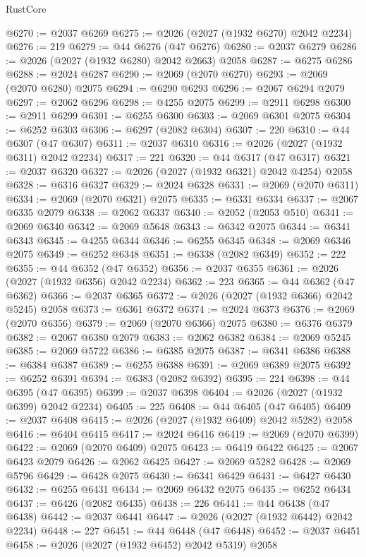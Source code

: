 \begin{lexlean}{RustCore}
\begin{coremodule}
@6270 := @2037 @6269
@6275 := @2026 (@2027 (@1932 @6270) @2042 @2234)
@6276 := 219
@6279 := @44 @6276 (@47 @6276)
@6280 := @2037 @6279
@6286 := @2026 (@2027 (@1932 @6280) @2042 @2663) @2058
@6287 := @6275 @6286
@6288 := @2024 @6287
@6290 := @2069 (@2070 @6270)
@6293 := @2069 (@2070 @6280) @2075
@6294 := @6290 @6293
@6296 := @2067 @6294 @2079
@6297 := @2062 @6296
@6298 := @4255 @2075
@6299 := @2911 @6298
@6300 := @2911 @6299
@6301 := @6255 @6300
@6303 := @2069 @6301 @2075
@6304 := @6252 @6303
@6306 := @6297 (@2082 @6304)
@6307 := 220
@6310 := @44 @6307 (@47 @6307)
@6311 := @2037 @6310
@6316 := @2026 (@2027 (@1932 @6311) @2042 @2234)
@6317 := 221
@6320 := @44 @6317 (@47 @6317)
@6321 := @2037 @6320
@6327 := @2026 (@2027 (@1932 @6321) @2042 @4254) @2058
@6328 := @6316 @6327
@6329 := @2024 @6328
@6331 := @2069 (@2070 @6311)
@6334 := @2069 (@2070 @6321) @2075
@6335 := @6331 @6334
@6337 := @2067 @6335 @2079
@6338 := @2062 @6337
@6340 := @2052 (@2053 @510)
@6341 := @2069 @6340
@6342 := @2069 @5648
@6343 := @6342 @2075
@6344 := @6341 @6343
@6345 := @4255 @6344
@6346 := @6255 @6345
@6348 := @2069 @6346 @2075
@6349 := @6252 @6348
@6351 := @6338 (@2082 @6349)
@6352 := 222
@6355 := @44 @6352 (@47 @6352)
@6356 := @2037 @6355
@6361 := @2026 (@2027 (@1932 @6356) @2042 @2234)
@6362 := 223
@6365 := @44 @6362 (@47 @6362)
@6366 := @2037 @6365
@6372 := @2026 (@2027 (@1932 @6366) @2042 @5245) @2058
@6373 := @6361 @6372
@6374 := @2024 @6373
@6376 := @2069 (@2070 @6356)
@6379 := @2069 (@2070 @6366) @2075
@6380 := @6376 @6379
@6382 := @2067 @6380 @2079
@6383 := @2062 @6382
@6384 := @2069 @5245
@6385 := @2069 @5722
@6386 := @6385 @2075
@6387 := @6341 @6386
@6388 := @6384 @6387
@6389 := @6255 @6388
@6391 := @2069 @6389 @2075
@6392 := @6252 @6391
@6394 := @6383 (@2082 @6392)
@6395 := 224
@6398 := @44 @6395 (@47 @6395)
@6399 := @2037 @6398
@6404 := @2026 (@2027 (@1932 @6399) @2042 @2234)
@6405 := 225
@6408 := @44 @6405 (@47 @6405)
@6409 := @2037 @6408
@6415 := @2026 (@2027 (@1932 @6409) @2042 @5282) @2058
@6416 := @6404 @6415
@6417 := @2024 @6416
@6419 := @2069 (@2070 @6399)
@6422 := @2069 (@2070 @6409) @2075
@6423 := @6419 @6422
@6425 := @2067 @6423 @2079
@6426 := @2062 @6425
@6427 := @2069 @5282
@6428 := @2069 @5796
@6429 := @6428 @2075
@6430 := @6341 @6429
@6431 := @6427 @6430
@6432 := @6255 @6431
@6434 := @2069 @6432 @2075
@6435 := @6252 @6434
@6437 := @6426 (@2082 @6435)
@6438 := 226
@6441 := @44 @6438 (@47 @6438)
@6442 := @2037 @6441
@6447 := @2026 (@2027 (@1932 @6442) @2042 @2234)
@6448 := 227
@6451 := @44 @6448 (@47 @6448)
@6452 := @2037 @6451
@6458 := @2026 (@2027 (@1932 @6452) @2042 @5319) @2058

\end{coremodule}
\end{lexlean}
